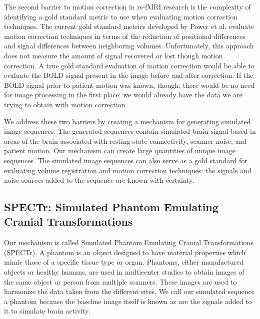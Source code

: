 The second barrier to motion correction in rs-fMRI research is the complexity of identifying a gold standard metric to use when evaluating motion correction techniques. The current gold standard metrics developed by Power et al. evaluate motion correction techniques in terms of the reduction of positional differences and signal differences between neighboring volumes. Unfortunately, this approach does not measure the amount of signal recovered or lost though motion correction. A true gold standard evaluation of motion correction would be able to evaluate the BOLD signal present in the image before and after correction. If the BOLD signal prior to patient motion was known, though, there would be no need for image processing in the first place: we would already have the data we are trying to obtain with motion correction.

We address these two barriers by creating a mechanism for generating simulated image sequences. The generated sequences contain simulated brain signal based in areas of the brain associated with resting-state connectivity, scanner noise, and patient motion. Our mechanism can create large quantities of unique image sequences. The simulated image sequences can also serve as a gold standard for evaluating volume registration and motion correction techniques: the signals and noise sources added to the sequence are known with certainty.


\subsection{SPECTr: Simulated Phantom Emulating Cranial Transformations}

Our mechanism is called Simulated Phantom Emulating Cranial Transformations (SPECTr). A phantom is an object designed to have material properties which mimic those of a specific tissue type or organ. Phantoms, either manufactured objects or healthy humans, are used in multicenter studies to obtain images of the same object or person from multiple scanners. These images are used to harmonize the data taken from the different sites. We call our simulated sequence a phantom because the baseline image itself is known as are the signals added to it to simulate brain activity. 

